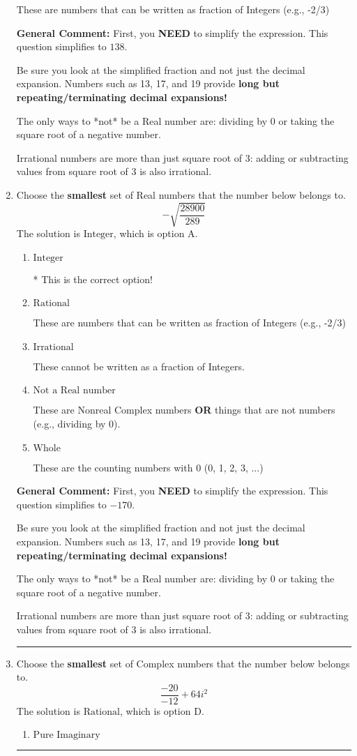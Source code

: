 \documentclass{extbook}[14pt]
\newcommand{\litem}[1]{\item #1

\rule{\textwidth}{0.4pt}}
\begin{document}
\begin{enumerate}
{\begin{enumerate}[label=\Alph*.]
These are numbers that can be written as fraction of Integers (e.g., -2/3)
\end{enumerate}

\textbf{General Comment:} First, you \textbf{NEED} to simplify the expression. This question simplifies to $138$. 
 
 Be sure you look at the simplified fraction and not just the decimal expansion. Numbers such as 13, 17, and 19 provide \textbf{long but repeating/terminating decimal expansions!} 
 
 The only ways to *not* be a Real number are: dividing by 0 or taking the square root of a negative number. 
 
 Irrational numbers are more than just square root of 3: adding or subtracting values from square root of 3 is also irrational.
}
\litem{
Choose the \textbf{smallest} set of Real numbers that the number below belongs to.
\[ -\sqrt{\frac{28900}{289}} \]The solution is \( \text{Integer} \), which is option A.\begin{enumerate}[label=\Alph*.]
\item \( \text{Integer} \)

* This is the correct option!
\item \( \text{Rational} \)

These are numbers that can be written as fraction of Integers (e.g., -2/3)
\item \( \text{Irrational} \)

These cannot be written as a fraction of Integers.
\item \( \text{Not a Real number} \)

These are Nonreal Complex numbers \textbf{OR} things that are not numbers (e.g., dividing by 0).
\item \( \text{Whole} \)

These are the counting numbers with 0 (0, 1, 2, 3, ...)
\end{enumerate}

\textbf{General Comment:} First, you \textbf{NEED} to simplify the expression. This question simplifies to $-170$. 
 
 Be sure you look at the simplified fraction and not just the decimal expansion. Numbers such as 13, 17, and 19 provide \textbf{long but repeating/terminating decimal expansions!} 
 
 The only ways to *not* be a Real number are: dividing by 0 or taking the square root of a negative number. 
 
 Irrational numbers are more than just square root of 3: adding or subtracting values from square root of 3 is also irrational.
}
\litem{
Choose the \textbf{smallest} set of Complex numbers that the number below belongs to.
\[ \frac{-20}{-12}+64i^2 \]The solution is \( \text{Rational} \), which is option D.\begin{enumerate}[label=\Alph*.]
\item \( \text{Pure Imaginary} \)


\end{enumerate}}
\end{enumerate}
\end{document}
